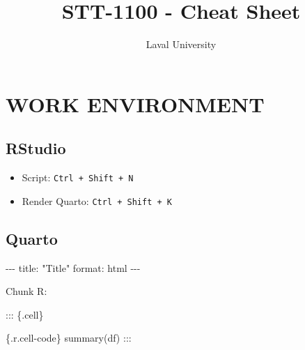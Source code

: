 \documentclass[
  english,
  8pt,
  letterpaper,
  DIV=11,
  numbers=noendperiod]{scrartcl}
\title{STT-1100 - Cheat Sheet}
\author{Laval University}
\date{}
\newenvironment{Shaded}{\begin{snugshade}}{\end{snugshade}}
\newcommand{\AnnotationTok}[1]{\textcolor[rgb]{0.37,0.37,0.37}{#1}}
\newcommand{\AttributeTok}[1]{\textcolor[rgb]{0.40,0.45,0.13}{#1}}
\newcommand{\CommentTok}[1]{\textcolor[rgb]{0.37,0.37,0.37}{#1}}
\newcommand{\ConstantTok}[1]{\textcolor[rgb]{0.56,0.35,0.01}{#1}}
\newcommand{\FunctionTok}[1]{\textcolor[rgb]{0.28,0.35,0.67}{#1}}
\newcommand{\NormalTok}[1]{\textcolor[rgb]{0.00,0.23,0.31}{#1}}
\newcommand{\SpecialCharTok}[1]{\textcolor[rgb]{0.37,0.37,0.37}{#1}}
\newcommand{\StringTok}[1]{\textcolor[rgb]{0.13,0.47,0.30}{#1}}
\providecommand{\tightlist}{%
  \setlength{\itemsep}{0pt}\setlength{\parskip}{0pt}}
\begin{document}
\maketitle


\begin{Shaded}
\end{Shaded}

\section{ WORK ENVIRONMENT}\label{work-environment}

\subsection{RStudio}\label{rstudio}

\begin{itemize}
\tightlist
\item
  Script: \texttt{Ctrl\ +\ Shift\ +\ N}
\item
  Render Quarto: \texttt{Ctrl\ +\ Shift\ +\ K}
\end{itemize}

\subsection{Quarto}\label{quarto}

\begin{Shaded}
\begin{Highlighting}[]
\CommentTok{{-}{-}{-}}
\AnnotationTok{title:}\CommentTok{ "Title"}
\AnnotationTok{format:}\CommentTok{ html}
\CommentTok{{-}{-}{-}}
\end{Highlighting}
\end{Shaded}

Chunk R:

\begin{Shaded}
\begin{Highlighting}[]

\SpecialCharTok{:::}\NormalTok{ \{.cell\}}

\StringTok{\textasciigrave{}\textasciigrave{}\textasciigrave{}}\AttributeTok{\{.r.cell{-}code\}}
\AttributeTok{summary(df)}
\StringTok{\textasciigrave{}\textasciigrave{}\textasciigrave{}}
\SpecialCharTok{:::}
\end{Highlighting}
\end{Shaded}
\end{document}
